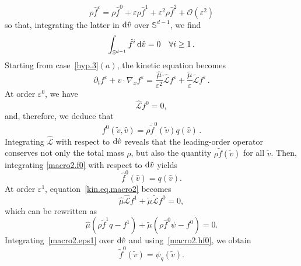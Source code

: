 \documentclass[a4paper]{article}
\theoremstyle{Theorem}\newtheorem{proposition}{Proposition}[section]
\theoremstyle{Remark}\newtheorem{remark}{Remark}[section]
\theoremstyle{Theorem}\newtheorem{theorem}{Theorem}[section]
\newcommand{\hv}{\hat{v}}
\newcommand{\tv}{\tilde{v}}
\newcommand{\hf}{\hat{f}}
\newcommand{\tf}{\tilde{f}}
\newcommand{\hmu}{\hat{\mu}}
\newcommand{\tmu}{\tilde{\mu}}
\newcommand{\intS}{\int_{\mathbb{S}^{d-1}}}
\begin{document}
\begin{equation*}
    \rho \hf^\varepsilon = \rho \hf^0+\varepsilon \rho \hf^1 +\varepsilon^2 \rho \hf^2 +\mathcal{O}(\varepsilon^2)
\end{equation*}
so that, integrating the latter in ${\rm d} \hv$ over $\mathbb{S}^{d-1}$, we find
\[
\intS \hf^i \, {\rm d} \hv =0 \quad \forall i \ge 1\,.
\]
Starting from case~\eqref{hyp.3}$(a)$, the kinetic equation becomes
\begin{equation}\label{kin.eq.macro2}
  \partial_t f^\varepsilon +v \cdot \nabla_x f^\varepsilon = \dfrac{\hmu}{\varepsilon^2}\hat{\mathcal{L}}f^\varepsilon +  \dfrac{\tmu}{\varepsilon}\tilde{\mathcal{L}} f^\varepsilon\,.
  \end{equation}
At order $\varepsilon^0$, we have
\begin{equation*}
\hat{\mathcal{L}}f^0=0,    
\end{equation*}
and, therefore, we deduce that
\begin{equation}\label{macro2.f0}
    f^0(\tv,\hv)=\rho \tf^0(\tv) q(\hv)\,.
\end{equation}
Integrating $\hat{\mathcal{L}}$ with respect to ${\rm d} \hv$ reveals that the leading-order operator conserves not only the total mass $\rho$, but also the quantity $\rho \tf(\tv)$ for all $\tv$.
Then, integrating \eqref{macro2.f0} with respect to ${\rm d}\tv$ yields
\begin{equation}\label{macro2.hf0}
     \hf^0(\hv)= q(\hv).
\end{equation}
At order $\varepsilon^1$, equation~\eqref{kin.eq.macro2} becomes
\begin{equation*}
\hmu\hat{\mathcal{L}}f^1 +  \tmu\tilde{\mathcal{L}} f^0=0,  
\end{equation*}
which can be rewritten as
\begin{equation}\label{macro2.eps1}
\hmu(\rho \tf^1 q-f^1)+\tmu (\rho \hf^0 \psi-f^0)=0.  \end{equation}
Integrating~\eqref{macro2.eps1} over ${\rm d}\hv$ and using~\eqref{macro2.hf0}, we obtain
\begin{equation}\label{macro2.tf0}
    \tf^0(\tv)=\psi_q(\tv).
\end{equation}
\end{document}
